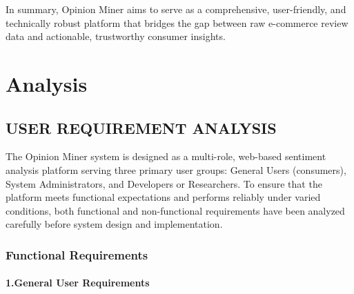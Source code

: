 \documentclass[12pt,a4paper]{report}
\begin{document}
In summary, Opinion Miner aims to serve as a comprehensive, user-friendly, and technically robust platform that bridges the gap between raw e-commerce review data and actionable, trustworthy consumer insights.

\chapter{Analysis}

\section{USER REQUIREMENT ANALYSIS}

The Opinion Miner system is designed as a multi-role, web-based sentiment analysis platform serving three primary user groups: General Users (consumers), System Administrators, and Developers or Researchers. To ensure that the platform meets functional expectations and performs reliably under varied conditions, both functional and non-functional requirements have been analyzed carefully before system design and implementation.

\subsection{Functional Requirements}

\subsubsection*{1.\quad General User Requirements}
\end{document}
